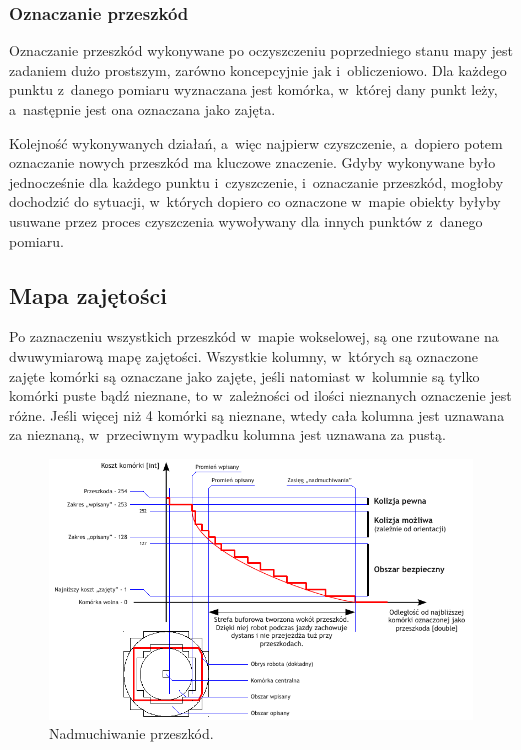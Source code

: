 \subsubsection{Oznaczanie przeszkód}

Oznaczanie przeszkód wykonywane po oczyszczeniu poprzedniego stanu mapy jest zadaniem
dużo prostszym, zarówno koncepcyjnie jak i~obliczeniowo. Dla każdego punktu z~danego
pomiaru wyznaczana jest komórka, w~której dany punkt leży, a~następnie jest ona
oznaczana jako zajęta.

Kolejność wykonywanych działań, a~więc najpierw czyszczenie, a~dopiero potem
oznaczanie nowych przeszkód ma kluczowe znaczenie. Gdyby wykonywane było jednocześnie
dla każdego punktu i~czyszczenie, i~oznaczanie przeszkód, mogłoby dochodzić do
sytuacji, w~których dopiero co oznaczone w~mapie obiekty byłyby usuwane przez proces
czyszczenia wywoływany dla innych punktów z~danego pomiaru.


\subsection{Mapa zajętości}

Po zaznaczeniu wszystkich przeszkód w~mapie wokselowej, są one rzutowane na
dwuwymiarową mapę zajętości. Wszystkie kolumny, w~których są oznaczone zajęte
komórki są oznaczane jako zajęte, jeśli natomiast w~kolumnie są tylko komórki
puste bądź nieznane, to w~zależności od ilości nieznanych oznaczenie jest różne.
Jeśli więcej niż 4 komórki są nieznane, wtedy cała kolumna jest uznawana za
nieznaną, w~przeciwnym wypadku kolumna jest uznawana za pustą.

\begin{figure}[htb!]
\centering
\includegraphics[width=15cm]{../../Common/img/ros/inflate.pdf}
\caption{Nadmuchiwanie przeszkód.}
\label{fig:inflation}
\end{figure}

